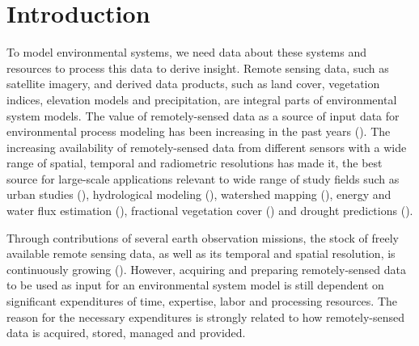 \chapter{Introduction}


To model environmental systems, we need data about these systems  and resources to process this data to derive insight. Remote sensing data, such as satellite imagery, and derived data products, such as land cover, vegetation indices, elevation models and precipitation, are integral parts of environmental system models. 
The value of remotely-sensed data as a source of input data for environmental process modeling has been increasing in the past years (\cite{melesse2007remote}). The increasing availability of remotely-sensed data from different sensors with a wide range of spatial, temporal and radiometric resolutions has made it, the best source for large-scale applications relevant to wide range of study fields such as urban studies (\cite{wu2000global}), hydrological modeling (\cite{bogh2004incorporating}), watershed mapping (\cite{melesse2003spatially}), energy and water flux estimation (\cite{melesse2005estimation}), fractional vegetation cover (\cite{carlson2000impact}) and drought predictions (\cite{rhee2010monitoring}).

Through contributions of several earth observation missions, the stock of freely available remote sensing data, as well as its temporal and spatial resolution, is continuously growing (\cite{melesse2007remote}).
However, acquiring and preparing remotely-sensed data to be used as input for an environmental system model is still dependent on significant expenditures of time, expertise, labor and processing resources. The reason for the necessary expenditures is strongly related to how remotely-sensed data is acquired, stored, managed and provided.

